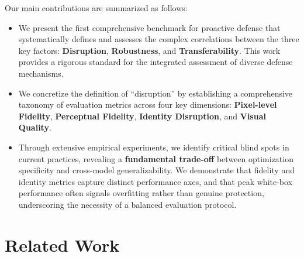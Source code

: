 \documentclass{article}
\begin{document}
Our main contributions are summarized as follows:
\begin{itemize}[leftmargin=*, nosep]
    \item We present the first comprehensive benchmark for proactive defense that systematically defines and assesses the complex correlations between the three key factors: \textbf{Disruption}, \textbf{Robustness}, and \textbf{Transferability}. This work provides a rigorous standard for the integrated assessment of diverse defense mechanisms.
    
    \item We concretize the definition of ``disruption'' by establishing a comprehensive taxonomy of evaluation metrics across four key dimensions: \textbf{Pixel-level Fidelity}, \textbf{Perceptual Fidelity}, \textbf{Identity Disruption}, and \textbf{Visual Quality}. %
    
    \item Through extensive empirical experiments, we identify critical blind spots in current practices, revealing a \textbf{fundamental trade-off} between optimization specificity and cross-model generalizability. We demonstrate that fidelity and identity metrics capture distinct performance axes, and that peak white-box performance often signals overfitting rather than genuine protection, underscoring the necessity of a balanced evaluation protocol.
\end{itemize}

\section{Related Work}
\end{document}
